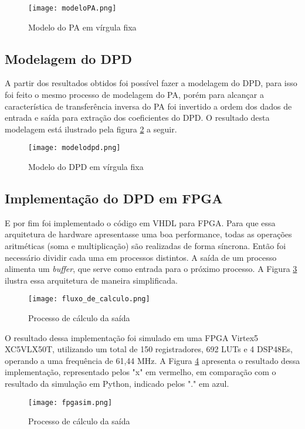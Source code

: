 \begin{figure}[htbp!]
    \centering
    \captionsetup{justification=centering}
    \texttt{[image: modeloPA.png]}
    \caption{Modelo do PA em vírgula fixa}
    \label{fig:modelopa}
\end{figure}

\subsection{Modelagem do DPD}
A partir dos resultados obtidos foi possível fazer a modelagem do DPD, para isso foi feito o mesmo processo de modelagem do PA, porém para alcançar a característica de transferência inversa do PA foi invertido a ordem dos dados de entrada e saída para extração dos coeficientes do DPD. O resultado desta modelagem está ilustrado pela figura \ref{fig:modelodpd} a seguir.

\begin{figure}[htbp!]
    \centering
    \captionsetup{justification=centering}
    \texttt{[image: modelodpd.png]}
    \caption{Modelo do DPD em vírgula fixa}
    \label{fig:modelodpd}
\end{figure}

\subsection{Implementação do DPD em FPGA}

E por fim foi implementado o código em VHDL para FPGA.
Para que essa arquitetura de hardware apresentasse uma boa performance, todas as operações aritméticas (soma e multiplicação) são realizadas de forma síncrona. Então foi necessário dividir cada uma em processos distintos. A saída de um processo alimenta um \textit{buffer}, que serve como entrada para o próximo processo. A Figura \ref{fig:diagramaprocesssimpl} ilustra essa arquitetura de maneira simplificada.

\begin{figure}[htbp!]
	\centering
	\captionsetup{justification=centering}
	\texttt{[image: fluxo\_de\_calculo.png]}
	\caption{Processo de cálculo da saída}
	\label{fig:diagramaprocesssimpl}
\end{figure}

O resultado dessa implementação foi simulado em uma FPGA Virtex5 XC5VLX50T, utilizando um total de 150 registradores, 692 LUTs e 4 DSP48Es, operando a uma frequência de 61,44 MHz. A Figura \ref{fig:fpgasim} apresenta o resultado dessa implementação, representado pelos "x" em vermelho, em comparação com o resultado da simulação em Python, indicado pelos "." em azul.

\begin{figure}[htbp!]
	\centering
	\captionsetup{justification=centering}
	\texttt{[image: fpgasim.png]}
	\caption{Processo de cálculo da saída}
	\label{fig:fpgasim}
\end{figure}
